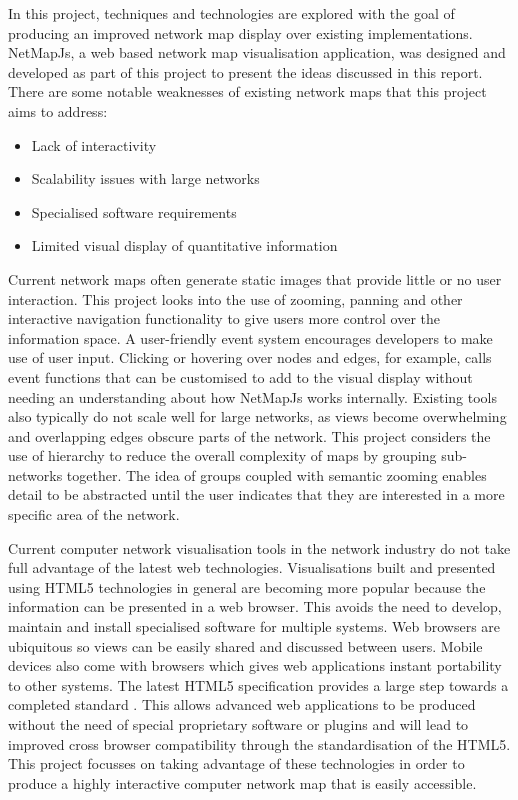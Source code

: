 \documentclass[11pt, a4paper]{report}
\begin{document}
In this project, techniques and technologies are explored with the goal of
producing an improved network map display over existing implementations.
NetMapJs, a web based network map visualisation application, was designed and
developed as part of this project to present the ideas discussed in this report.
There are some notable weaknesses of existing network maps that this project
aims to address:

\begin{itemize}
  \item Lack of interactivity
  \item Scalability issues with large networks
  \item Specialised software requirements
  \item Limited visual display of quantitative information
\end{itemize}

 
Current network maps often generate static images that provide little or no user
interaction. This project looks into the use of zooming, panning and other
interactive navigation functionality to give users more control over the
information space. A user-friendly event system encourages developers to make
use of user input. Clicking or hovering over nodes and edges, for example, calls
event functions that can be customised to add to the visual display without
needing an understanding about how NetMapJs works internally. Existing tools
also typically do not scale well for large networks, as views become
overwhelming and overlapping edges obscure parts of the network. This project
considers the use of hierarchy to reduce the overall complexity of maps by
grouping sub-networks together. The idea of groups coupled with semantic zooming
enables detail to be abstracted until the user indicates that they are
interested in a more specific area of the network.

Current computer network visualisation tools in the network industry do not take
full advantage of the latest web technologies. Visualisations built and
presented using HTML5 technologies in general are becoming more popular because
the information can be presented in a web browser. This avoids the need to
develop, maintain and install specialised software for multiple systems. Web
browsers are ubiquitous so views can be easily shared and discussed between
users. Mobile devices also come with browsers which gives web applications
instant portability to other systems. The latest HTML5 specification provides a
large step towards a completed standard \cite{HTML5_website}. This allows
advanced web applications to be produced without the need of special proprietary 
software or plugins and will lead to improved cross browser compatibility
through the standardisation of the HTML5. This project focusses on taking
advantage of these technologies in order to produce a highly interactive
computer network map that is easily accessible.
\end{document}
